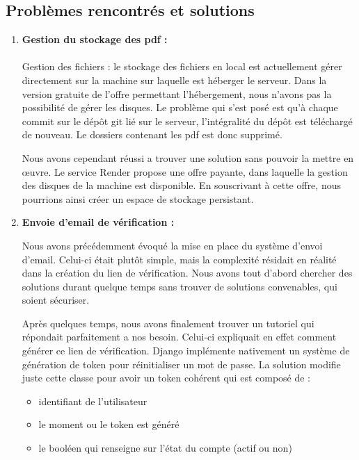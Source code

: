 \documentclass[12pt]{article} %
\begin{document}
	\subsection{Problèmes rencontrés et solutions}
        \begin{enumerate}
            \item \textbf{Gestion du stockage des pdf :}\\\\
                Gestion des fichiers : le stockage des fichiers en local est actuellement gérer directement sur la machine sur laquelle est héberger le serveur. Dans la version gratuite de l'offre permettant l'hébergement, nous n'avons pas la possibilité de gérer les disques. Le problème qui s'est posé est qu'à chaque commit sur le dépôt git lié sur le serveur, l'intégralité du dépôt est téléchargé de nouveau. Le dossiers contenant les pdf est donc supprimé. 
                
                Nous avons cependant réussi a trouver une solution sans pouvoir la mettre en œuvre. Le service Render propose une offre payante, dans laquelle la gestion des disques de la machine est disponible. En souscrivant à cette offre, nous pourrions ainsi créer un espace de stockage persistant.
                
			\item \textbf{Envoie d'email de vérification :}
			
				Nous avons précédemment évoqué la mise en place du système d'envoi d'email. Celui-ci était plutôt simple, mais la complexité résidait en réalité dans la création du lien de vérification. Nous avons tout d'abord chercher des solutions durant quelque temps sans trouver de solutions convenables, qui soient sécuriser. 
				
				Après quelques temps, nous avons finalement trouver un tutoriel qui répondait parfaitement a nos besoin. Celui-ci expliquait en effet comment générer ce lien de vérification. Django implémente nativement un système de génération de token pour réinitialiser un mot de passe. La solution modifie juste cette classe pour avoir un token cohérent qui est composé de :
		\begin{itemize}
			\item identifiant de l'utilisateur
			\item le moment ou le token est généré 
			\item le booléen qui renseigne sur l'état du compte (actif ou non)
		\end{itemize}
		

\end{enumerate}
\end{document}
